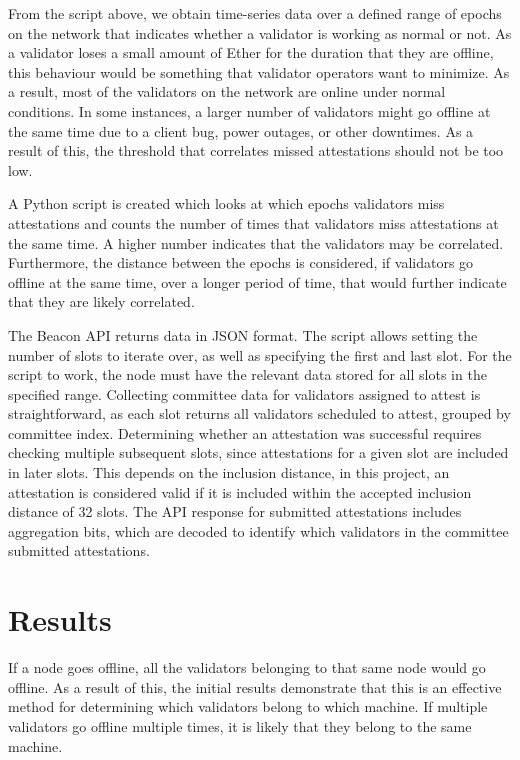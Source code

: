 \documentclass[runningheads]{llncs}
\begin{document}
From the script above, we obtain time-series data over a defined range of epochs on the network that indicates whether a validator is working as normal or not. As a validator loses a small amount of Ether for the duration that they are offline, this behaviour would be something that validator operators want to minimize. As a result, most of the validators on the network are online under normal conditions. In some instances, a larger number of validators might go offline at the same time due to a client bug, power outages, or other downtimes.
As a result of this, the threshold that correlates missed attestations should not be too low. 

A Python script is created which looks at which epochs validators miss attestations and counts the number of times that validators miss attestations at the same time.
A higher number indicates that the validators may be correlated. Furthermore, the distance between the epochs is considered, if validators go offline at the same time, over a longer period of time, that would further indicate that they are likely correlated. 

The Beacon API returns data in JSON format. The script allows setting the number of slots to iterate over, as well as specifying the first and last slot. For the script to work, the node must have the relevant data stored for all slots in the specified range. Collecting committee data for validators assigned to attest is straightforward, as each slot returns all validators scheduled to attest, grouped by committee index. Determining whether an attestation was successful requires checking multiple subsequent slots, since attestations for a given slot are included in later slots. This depends on the inclusion distance, in this project, an attestation is considered valid if it is included within the accepted inclusion distance of 32 slots. The API response for submitted attestations includes aggregation bits, which are decoded to identify which validators in the committee submitted attestations. 

\section{Results}
If a node goes offline, all the validators belonging to that same node would go offline. As a result of this, the initial results demonstrate that this is an effective method for determining which validators belong to which machine. If multiple validators go offline multiple times, it is likely that they belong to the same machine. 
\end{document}
